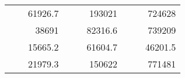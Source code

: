 \begin{table}[H]
\begin{tabular}{|ccrccrccc}
\rowcolor[HTML]{DDFDFF} 
\multicolumn{1}{|c|}{\cellcolor[HTML]{FFFFC7}}                                & \multicolumn{1}{c|}{\cellcolor[HTML]{DDFDFF}}                      & \multicolumn{1}{r|}{\cellcolor[HTML]{DAE8FC}61926.7}   & \multicolumn{1}{c|}{\cellcolor[HTML]{FFFFC7}}                                & \multicolumn{1}{c|}{\cellcolor[HTML]{DDFDFF}}                       & \multicolumn{1}{r|}{\cellcolor[HTML]{DDFDFF}193021}    & \multicolumn{1}{c|}{\cellcolor[HTML]{FFFFC7}}                                & \multicolumn{1}{c|}{\cellcolor[HTML]{DDFDFF}}                      & \multicolumn{1}{r|}{\cellcolor[HTML]{DDFDFF}724628}    \\ \cline{3-3} \cline{6-6} \cline{9-9} 
\multicolumn{1}{|c|}{\cellcolor[HTML]{FFFFC7}}                                & \multicolumn{1}{c|}{\cellcolor[HTML]{DDFDFF}}                      & \multicolumn{1}{r|}{\cellcolor[HTML]{DDFDFF}38691}     & \multicolumn{1}{c|}{\cellcolor[HTML]{FFFFC7}}                                & \multicolumn{1}{c|}{\cellcolor[HTML]{DDFDFF}}                       & \multicolumn{1}{r|}{\cellcolor[HTML]{DAE8FC}82316.6}   & \multicolumn{1}{c|}{\cellcolor[HTML]{FFFFC7}}                                & \multicolumn{1}{c|}{\cellcolor[HTML]{DDFDFF}}                      & \multicolumn{1}{r|}{\cellcolor[HTML]{DAE8FC}739209}    \\ \cline{3-3} \cline{6-6} \cline{9-9} 
\rowcolor[HTML]{DDFDFF} 
\multicolumn{1}{|c|}{\cellcolor[HTML]{FFFFC7}}                                & \multicolumn{1}{c|}{\cellcolor[HTML]{DDFDFF}}                      & \multicolumn{1}{r|}{\cellcolor[HTML]{DAE8FC}15665.2}   & \multicolumn{1}{c|}{\cellcolor[HTML]{FFFFC7}}                                & \multicolumn{1}{c|}{\cellcolor[HTML]{DDFDFF}}                       & \multicolumn{1}{r|}{\cellcolor[HTML]{DDFDFF}61604.7}   & \multicolumn{1}{c|}{\cellcolor[HTML]{FFFFC7}}                                & \multicolumn{1}{c|}{\cellcolor[HTML]{DDFDFF}}                      & \multicolumn{1}{r|}{\cellcolor[HTML]{DDFDFF}46201.5}   \\ \cline{3-3} \cline{6-6} \cline{9-9} 
\multicolumn{1}{|c|}{\cellcolor[HTML]{FFFFC7}}                                & \multicolumn{1}{c|}{\cellcolor[HTML]{DDFDFF}}                      & \multicolumn{1}{r|}{\cellcolor[HTML]{DDFDFF}21979.3}   & \multicolumn{1}{c|}{\cellcolor[HTML]{FFFFC7}}                                & \multicolumn{1}{c|}{\cellcolor[HTML]{DDFDFF}}                       & \multicolumn{1}{r|}{\cellcolor[HTML]{DAE8FC}150622}    & \multicolumn{1}{c|}{\cellcolor[HTML]{FFFFC7}}                                & \multicolumn{1}{c|}{\cellcolor[HTML]{DDFDFF}}                      & \multicolumn{1}{r|}{\cellcolor[HTML]{DAE8FC}771481}    \\ \cline{3-3} \cline{6-6} \cline{9-9} 

\end{tabular}
\end{table}
